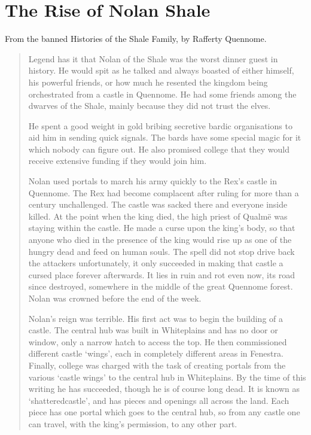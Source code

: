 \section{The Rise of Nolan Shale}
\label{nolan}

\begin{multicols}{2}

\noindent From the banned Histories of the Shale Family, by Rafferty Quennome.

\begin{quotation}

  Legend has it that Nolan of the Shale was the worst dinner guest in history.
  He would spit as he talked and always boasted of either himself, his powerful friends, or how much he resented the kingdom being orchestrated from a castle in Quennome.
  He had some friends among the dwarves of the Shale, mainly because they did not trust the elves.

  He spent a good weight in gold bribing secretive bardic organisations to aid him in sending quick signals.
  The bards have some special magic for it which nobody can figure out.
  He also promised \gls{college} that they would receive extensive funding if they would join him.

  Nolan used portals to march his army quickly to the Rex's castle in Quennome.
  The Rex had become complacent after ruling for more than a century unchallenged.
  The castle was sacked there and everyone inside killed.
  At the point when the king died, the high priest of Qualm\"{e} was staying within the castle.
  He made a curse upon the king's body, so that anyone who died in the presence of the king would rise up as one of the hungry dead and feed on human souls.
  The spell did not stop drive back the attackers unfortunately, it only succeeded in making that castle a cursed place forever afterwards.
  It lies in ruin and rot even now, its road since destroyed, somewhere in the middle of the great Quennome forest.
  Nolan was crowned before the end of the week.

  Nolan's reign was terrible.
  His first act was to begin the building of a castle.
  The central hub was built in Whiteplains and has no door or window, only a narrow hatch to access the top.
  He then commissioned different castle `wings', each in completely different areas in Fenestra.
  Finally, \gls{college} was charged with the task of creating portals from the various `castle wings' to the central hub in Whiteplains.
  By the time of this writing he has succeeded, though he is of course long dead.
  It is known as `\gls{shatteredcastle}', and has pieces and openings all across the land.
  Each piece has one portal which goes to the central hub, so from any castle one can travel, with the king's permission, to any other part.


\end{quotation}
\end{multicols}
